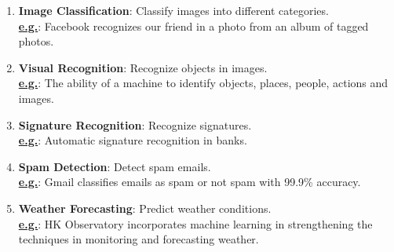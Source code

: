\documentclass{book}
\begin{document}
\begin{enumerate}
    \item \textbf{Image Classification}: Classify images into different categories.\\
    \underline{\textbf{e.g.}}: Facebook recognizes our friend in a photo from an album of tagged photos.
    \vspace{1mm}
    \item \textbf{Visual Recognition}: Recognize objects in images.\\
    \underline{\textbf{e.g.}}: The ability of a machine to identify objects, places, people, actions and images.
    \vspace{1mm}
    \item \textbf{Signature Recognition}: Recognize signatures.\\
    \underline{\textbf{e.g.}}: Automatic signature recognition in banks.
    \vspace{1mm}
    \item \textbf{Spam Detection}: Detect spam emails.\\
    \underline{\textbf{e.g.}}: Gmail classifies emails as spam or not spam with 99.9\% accuracy.
    \vspace{1mm}
    \item \textbf{Weather Forecasting}: Predict weather conditions.\\
    \underline{\textbf{e.g.}}: HK Observatory incorporates machine learning in strengthening the techniques in monitoring and forecasting weather.
\end{enumerate}
\newpage
\end{document}
